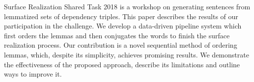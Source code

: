 Surface Realization Shared Task 2018 is a workshop on generating sentences from lemmatized sets of dependency triples.  This paper describes the results of our participation in the challenge. We develop a data-driven pipeline system which first orders the lemmas and then conjugates the words to finish the surface realization process. Our contribution is a novel sequential method of ordering lemmas, which, despite its simplicity, achieves promising results. We demonstrate the effectiveness of the proposed approach, describe its limitations and outline ways to improve it.
